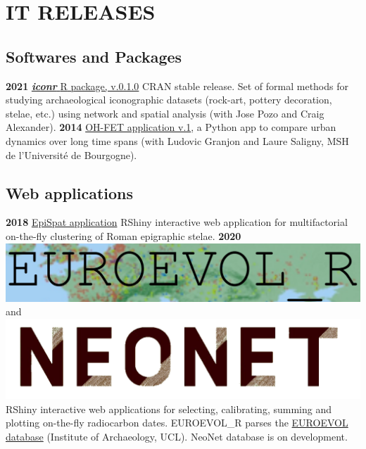\documentclass{article}
\begin{document}
\section{IT RELEASES}

\subsection*{Softwares and Packages}

\textbf{2021 }\href{https://cran.r-project.org/web/packages/iconr/index.html}{\textbf{\textit{iconr}} \textsf{R} package, v.0.1.0} CRAN stable release. Set of formal methods for studying archaeological iconographic datasets (rock-art, pottery decoration, stelae, etc.) using network and spatial analysis (with Jose Pozo and Craig Alexander).
\smallbreak
\textbf{2014 }\href{https://www.oxbowbooks.com/dbbc/caa2014-21st-century-archaeology.html/}{OH-FET application v.1}, a \textsf{Python} app to compare urban dynamics over long time spans (with Ludovic Granjon and Laure Saligny, MSH de l'Universit\'{e} de Bourgogne).

\subsection*{Web applications}

\textbf{2018 }\href{https://epispat.shinyapps.io/analyses_mult_5/}{EpiSpat application} \textsf{RShiny} interactive web application for multifactorial on-the-fly clustering of Roman epigraphic stelae.
\smallbreak
\textbf{2020 }\href{https://neolithic.shinyapps.io/Euroevol\_R/}{\includegraphics[scale=0.20]{euroevol_R}} and \href{https://neolithic.shinyapps.io/neonet2/}{\includegraphics[scale=0.04]{neonet}} \textsf{RShiny} interactive web applications for selecting, calibrating, summing and plotting on-the-fly radiocarbon dates. EUROEVOL\_R parses the \href{http://discovery.ucl.ac.uk/1469811/}{EUROEVOL database} (Institute of Archaeology, UCL). NeoNet database is on development.
\end{document}
